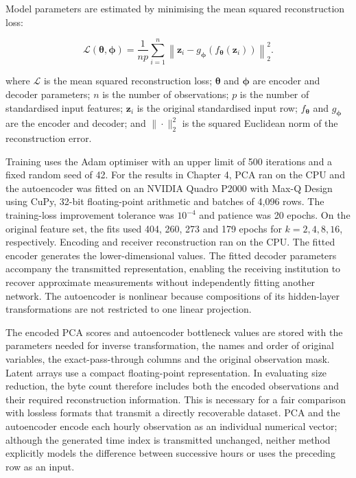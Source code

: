 \noindent Model parameters are estimated by minimising the mean squared
reconstruction loss:

\[
\mathcal{L}(\boldsymbol{\theta},\boldsymbol{\phi})
=\frac{1}{np}\sum_{i=1}^{n}
\left\|
\boldsymbol{z}_i-
g_{\boldsymbol{\phi}}\!\left(
f_{\boldsymbol{\theta}}(\boldsymbol{z}_i)
\right)\right\|_2^2.\tag{3.7.11}
\]

\noindent where \(\mathcal{L}\) is the mean squared reconstruction loss;
\(\boldsymbol{\theta}\) and \(\boldsymbol{\phi}\) are encoder and
decoder parameters; \(n\) is the number of observations; \(p\) is the
number of standardised input features; \(\boldsymbol{z}_i\) is the
original standardised input row; \(f_{\boldsymbol{\theta}}\) and
\(g_{\boldsymbol{\phi}}\) are the encoder and decoder; and
\(\|\cdot\|_2^2\) is the squared Euclidean norm of the reconstruction
error.

\noindent Training uses the Adam optimiser with an upper limit of 500 iterations
and a fixed random seed of 42. For the results in Chapter 4, PCA ran on
the CPU and the autoencoder was fitted on an NVIDIA Quadro P2000 with
Max-Q Design using CuPy, 32-bit floating-point arithmetic and batches
of 4,096 rows. The training-loss improvement tolerance was \(10^{-4}\)
and patience was 20 epochs. On the original feature set, the fits used
404, 260, 273 and 179 epochs for \(k=2,4,8,16\), respectively.
Encoding and receiver reconstruction ran on the CPU. The fitted encoder generates the
lower-dimensional values. The fitted decoder parameters accompany the
transmitted representation, enabling the receiving institution to
recover approximate measurements without independently fitting another
network. The autoencoder is nonlinear because compositions of its
hidden-layer transformations are not restricted to one linear
projection.

\noindent The encoded PCA scores and autoencoder bottleneck values are stored with
the parameters needed for inverse transformation, the names and order of
original variables, the exact-pass-through columns and the original
observation mask. Latent arrays use a compact floating-point
representation. In evaluating size reduction, the byte count therefore
includes both the encoded observations and their required reconstruction
information. This is necessary for a fair comparison with lossless
formats that transmit a directly recoverable dataset. PCA and the
autoencoder encode each hourly observation as an individual numerical
vector; although the generated time index is transmitted unchanged,
neither method explicitly models the difference between successive hours
or uses the preceding row as an input.

